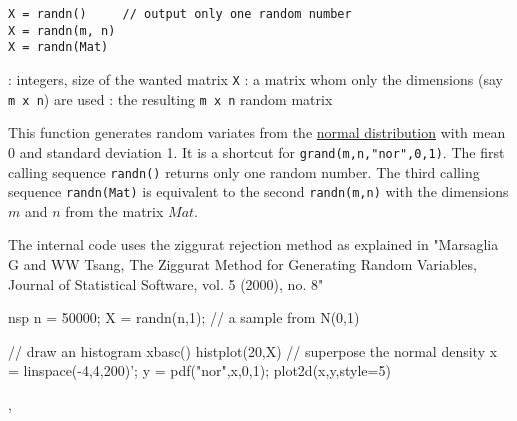 \begin{mandesc}
\end{mandesc}
\begin{calling_sequence}
\begin{verbatim}
X = randn()     // output only one random number 
X = randn(m, n)
X = randn(Mat)
\end{verbatim}
\end{calling_sequence}
\begin{parameters}
  \begin{varlist}
    : integers, size of the wanted matrix \verb!X!
   : a matrix whom only the dimensions (say \verb!m x n!) are used
   : the resulting \verb!m x n! random matrix
  \end{varlist}
  \end{parameters}
  
\begin{mandescription}
  This function generates random variates from the  \hyperlink{norpdf}{normal distribution} with
 mean 0 and standard deviation 1. It is a shortcut for \verb+grand(m,n,"nor",0,1)+.
  The first calling sequence \verb+randn()+ returns only one random number. The
 third calling sequence \verb+randn(Mat)+ is equivalent to the second  
 \verb+randn(m,n)+ with the dimensions $m$ and $n$ from the matrix $Mat$.

  The internal code uses the ziggurat rejection method as explained in "Marsaglia 
G and WW Tsang, The Ziggurat Method for Generating Random Variables, Journal of Statistical 
 Software, vol. 5 (2000), no. 8"
 
\end{mandescription}

\begin{examples}
\begin{mintednsp}{nsp}
n = 50000;
X = randn(n,1);  // a sample from N(0,1)

// draw an histogram
xbasc()
histplot(20,X)
// superpose the normal density
x = linspace(-4,4,200)';
y = pdf("nor",x,0,1);
plot2d(x,y,style=5)
\end{mintednsp}
\end{examples}

\begin{manseealso}
  ,    
\end{manseealso}



